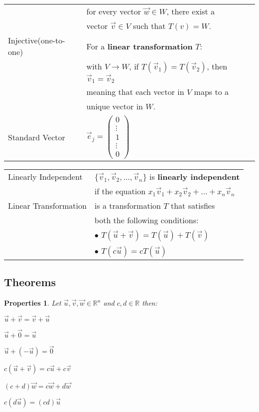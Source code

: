 \documentclass[5pt]{article}
\begin{document}
\begin{multicols}{2}
\begin{tabular}{ll}
                            & for every vector $\vec{w}\in W$, there exist a\\
                            & vector $\vec{v}\in V$ such that $T(v)=W$.\\
\small{Injective}\footnotesize{(one-to-one)}                   & For a \textbf{linear transformation} $T$:\\
                            & with $V\rightarrow W$, if $T(\vec{v}_1)=T(\vec{v}_2)$, then $\vec{v}_1=\vec{v}_2$\\
                            & meaning that each vector in $V$ maps to a\\
                            & unique vector in $W$.\\
Standard Vector             & $\vec{e}_j=$\footnotesize{$\begin{pmatrix}0\\ \vdots\\ 1\\ \vdots\\ 0\end{pmatrix}$}\\
\end{tabular}
\begin{tabular}{ll}
Linearly Independent  & $\{\vec{v}_1, \vec{v}_2, ..., \vec{v}_n\}$ is \textbf{linearly independent}\\
                      & if the equation $x_1\vec{v}_1 + x_2\vec{v}_2 + ... + x_n\vec{v}_n$\\
Linear Transformation & is a transformation $T$ that satisfies\\
                      & both the following conditions:\\
                      & $\bullet$ $T(\vec{u}+\vec{v}) = T(\vec{u}) + T(\vec{v})$\\
                      & $\bullet$ $T(c\vec{u})=cT(\vec{u})$\\
\end{tabular}

\subsection{Theorems}
\newtheorem{theorem}{Theorem}
\newtheorem{properties}{Properties}

\begin{properties}
  Let $\vec{u},\vec{v}, \vec{w}\in \mathbb{R}^n$ and $c,d\in\mathbb{R}$ then:
  \begin{itemize*}
    \item $\vec{u}+\vec{v}=\vec{v}+\vec{u}$
    \item $\vec{u}+\vec{0}=\vec{u}$
    \item $\vec{u}+(-\vec{u})=\vec{0}$
    \item $c(\vec{u}+\vec{v})=c\vec{u}+c\vec{v}$
    \item $(c+d)\vec{w}=c\vec{w}+d\vec{w}$
    \item $c(d\vec{u})=(cd)\vec{u}$
  \end{itemize*}
\end{properties}


\end{multicols}
\end{document}
